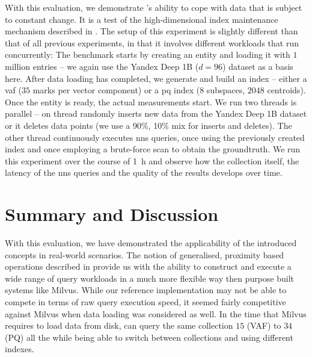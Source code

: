 With this evaluation, we demonstrate \cottontail{}'s ability to cope with data that is subject to constant change. It is a test of the high-dimensional index maintenance mechanism described in . The setup of this experiment is slightly different than that of all previous experiments, in that it involves different workloads that run concurrently: The benchmark starts by creating an entity and loading it with $1$ million entries -- we again use the Yandex Deep 1B ($d = 96$) dataset as a basis here. After data loading has completed, we generate and build an index -- either a \acrshort{vaf} ($35$ marks per vector component) or a \acrshort{pq} index ($8$ subspaces, $2048$ centroids). Once the entity is ready, the actual measurements start. We run two threads is parallel -- on thread randomly inserts new data from the Yandex Deep 1B dataset or it deletes data points (we use a 90\%, 10\% mix for inserts and deletes). The other thread continuously executes \acrshort{nns} queries, once using the previously created index and once employing a brute-force scan to obtain the groundtruth. We run this experiment over the course of \SI{1}{\hour} and observe how the collection itself, the latency of the \acrshort{nns} queries and the quality of the results develops over time.


\section{Summary and Discussion}
\label{section:discussion}

With this evaluation, we have demonstrated the applicability of the introduced concepts in real-world scenarios. The notion of generalised, proximity based operations described in  provide us with the ability to construct and execute a wide range of query workloads in a much more flexible way then purpose built systems like Milvus. While our reference implementation \cottontail{} may not be able to compete in terms of raw query execution speed, it seemed fairly competitive against Milvus when data loading was considered as well. In the time that Milvus requires to load data from disk, \cottontail{} can query the same collection $15$ (VAF) to $34$ (PQ) all the while being able to switch between collections and using different indexes.
